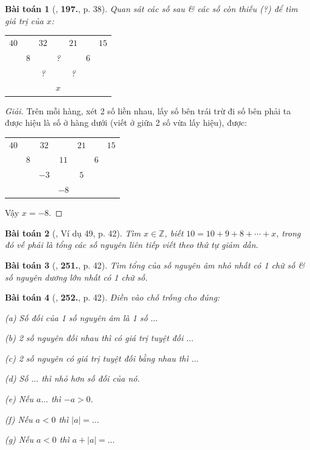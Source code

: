 \documentclass{article}
\numberwithin{equation}{section}
\newtheorem{baitoan}{Bài toán}
\begin{document}
\begin{baitoan}[\cite{Tuyen_Toan_6}, \textbf{197.}, p. 38]
	Quan sát các số sau \& các số còn thiếu (?) để tìm giá trị của $x$:
	\begin{table}[H]
		\centering
		\begin{tabular}{ccccccc}
			$40$ &  & $32$ &  & $21$ &  &  $15$ \\
			& $8$ &  & ? &  & $6$ &  \\
			&  & ? &  & ? &  &  \\
			&  &  & $x$ &  &  &  \\
		\end{tabular}
	\end{table}
\end{baitoan}

\begin{proof}[Giải]
	Trên mỗi hàng, xét 2 số liền nhau, lấy số bên trái trừ đi số bên phải ta được hiệu là số ở hàng dưới (viết ở giữa 2 số vừa lấy hiệu), được:
	\begin{table}[H]
		\centering
		\begin{tabular}{ccccccc}
			$40$ &  & $32$ &  & $21$ &  &  $15$ \\
			& $8$ &  & $11$ &  & $6$ &  \\
			&  & $-3$ &  & $5$ &  &  \\
			&  &  & $-8$ &  &  &  \\
		\end{tabular}
	\end{table}
	Vậy $x = -8$.
\end{proof}

\begin{baitoan}[\cite{Binh_Toan_6_tap_1}, Ví dụ 49, p. 42]
	Tìm $x\in\mathbb{Z}$, biết $10 = 10 + 9 + 8 + \cdots + x$, trong đó vế phải là tổng các số nguyên liên tiếp viết theo thứ tự giảm dần.
\end{baitoan}

\begin{baitoan}[\cite{Binh_Toan_6_tap_1}, \textbf{251.}, p. 42]
	Tìm tổng của số nguyên âm nhỏ nhất có 1 chữ số \& số nguyên dương lớn nhất có 1 chữ số.
\end{baitoan}

\begin{baitoan}[\cite{Binh_Toan_6_tap_1}, \textbf{252.}, p. 42]
	Điền vào chỗ trống cho đúng:
	\begin{enumerate*}
		\item[(a)] Số đối của 1 số nguyên âm là 1 số $\ldots$
		\item[(b)] 2 số nguyên đối nhau thì có giá trị tuyệt đối $\ldots$
		\item[(c)] 2 số nguyên có giá trị tuyệt đối bằng nhau thì $\ldots$
		\item[(d)] Số $\ldots$ thì nhỏ hơn số đối của nó.
		\item[(e)] Nếu $a\ldots$ thì $-a > 0$.
		\item[(f)] Nếu $a < 0$ thì $|a| = \ldots$
		\item[(g)] Nếu $a < 0$ thì $a + |a| = \ldots$
	\end{enumerate*}
\end{baitoan}
\end{document}
